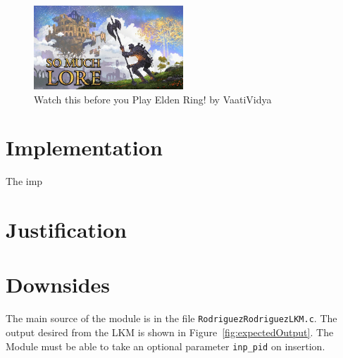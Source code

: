 \documentclass{article}
\begin{document}
 \begin{figure}[h!]
  \centering
  \includegraphics[width=0.5\textwidth]{VaatiVidya.png}
  \caption{Watch this before you Play Elden Ring! by VaatiVidya}
  \label{fig:thumbnail3}
  \end{figure}



\section{Implementation}

The imp

\section{Justification}

\section{Downsides}

The main source of the module is in the file \texttt{RodriguezRodriguezLKM.c}.
The output desired from the LKM is shown in Figure~\ref{fig:expectedOutput}. 
The Module must be able to take an optional parameter \texttt{inp\_pid} on insertion.\\
\end{document}
